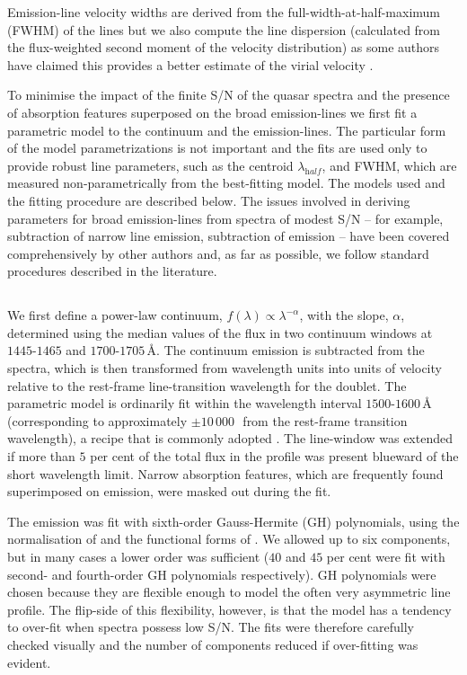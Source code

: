 Emission-line velocity widths are derived from the full-width-at-half-maximum (FWHM) of the lines but we also compute the line dispersion (calculated from the flux-weighted second moment of the velocity distribution) as some authors have claimed this provides a better estimate of the virial velocity \citep{denney13}. 

To minimise the impact of the finite S/N of the quasar spectra and the presence of absorption features superposed on the broad emission-lines we first fit a parametric model to the continuum and the emission-lines. 
The particular form of the model parametrizations is not important and the fits are used only to provide robust line parameters, such as the centroid $\lambda_{\mathrm half}$, and FWHM, which are measured non-parametrically from the best-fitting model. 
The models used and the fitting procedure are described below. 
The issues involved in deriving parameters for broad emission-lines from spectra of modest S/N -- for example, subtraction of narrow line emission, subtraction of  emission -- have been covered comprehensively by other authors \citep[e.g.][]{shen11,shen12,denney13,shen16a} and, as far as possible, we follow standard procedures described in the literature. 

\subsection{}
\label{sec:civ}

We first define a power-law continuum, $f(\lambda) \propto \lambda^{-\alpha}$, with the slope, $\alpha$, determined using the median values of the flux in two continuum windows at $1445$-$1465$ and $1700$-$1705$\,\AA. 
The continuum emission is subtracted from the spectra, which is then transformed from wavelength units into units of velocity relative to the rest-frame line-transition wavelength for the  doublet.
The parametric model is ordinarily fit within the wavelength interval $1500$-$1600$\,\AA\, (corresponding to approximately $\pm 10\,000$\,\kms\, from the rest-frame transition wavelength), a recipe that is commonly adopted \citep[e.g.][]{denney13}. 
The line-window was extended if more than $5$ per cent of the total flux in the profile was present blueward of the short wavelength limit. 
Narrow absorption features, which are frequently found superimposed on  emission, were masked out during the fit. 

The  emission was fit with sixth-order Gauss-Hermite (GH) polynomials, using the normalisation of \citet{marel93} and the functional forms of \citet{cappellari02}. 
We allowed up to six components, but in many cases a lower order was sufficient ($40$ and $45$ per cent were fit with second- and fourth-order GH polynomials respectively).
GH polynomials were chosen because they are flexible enough to model the often very asymmetric  line profile. 
The flip-side of this flexibility, however, is that the model has a tendency to over-fit when spectra possess low S/N. 
The fits were therefore carefully checked visually and the number of components reduced if over-fitting was evident.

